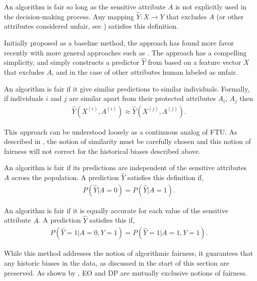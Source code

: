 \begin{define}
  An algorithm is fair so long as the sensitive attribute $A$ is not
  explicitly used in the decision-making process. Any mapping
  $\hat{Y}: X \rightarrow Y$ that excludes $A$ (or other attributes
  considered  unfair, see \citet{grgiccase}) satisfies this
  definition.
\end{define}
Initially proposed as a baseline method, the approach has found more favor
recently with more general approaches such as \cite{grgiccase}.  The
approach has a compelling simplicity, and simply constructs a
predictor $\hat Y$ from based on a feature vector $X$ that excludes
$A$, and in the case of \cite{grgiccase} other attributes human
labeled as unfair.
%
\begin{define}
  An algorithm is fair if it give similar predictions to similar
  individuals. Formally, if individuals $i$ and $j$ are similar apart
  from their protected attributes $A_i$, $A_j$ then
\begin{align}
  \hat{Y}(X^{(i)}, A^{(i)}) \approx \hat{Y}(X^{(j)}, A^{(j)}).\nonumber
\end{align}
\end{define}
This approach can be understood loosely as a continuous analog of
FTU. As described in \cite{dwork2012fairness}, the
notion of similarity must be carefully chosen and this notion of fairness
will not correct for the historical biases described above.
%
\begin{define}
  An algorithm is fair if its predictions are independent of the
  sensitive attributes $A$ across the population. A prediction
  $\hat{Y}$ satisfies this definition if,
\begin{align}
P(\hat{Y} | A = 0) = P(\hat{Y} | A = 1). \nonumber
\end{align}
\end{define}
%
\begin{define}
An algorithm is fair if it is equally accurate for each value of the sensitive attribute $A$. A prediction $\hat{Y}$ satisfies this if,
\begin{align}
P(\hat{Y}=1 | A=0,Y=1) = P(\hat{Y}=1 | A=1,Y=1). \nonumber
\end{align}
\end{define}
While this method addresses  the notion of algorithmic fairness, it guarantees that any historic biases in the data, as discussed in the start of this section are preserved. As shown by \citet{kleinberg2016inherent}, EO and DP are mutually exclusive notions of fairness.

